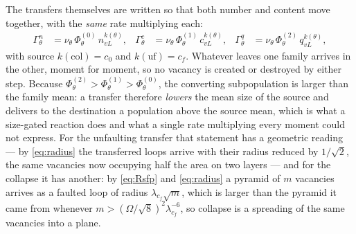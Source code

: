 \documentclass{article}
\begin{document}
The transfers themselves are written so that both number and content move
together, with the \emph{same} rate multiplying each:
\begin{align}
  \Gamma^{n}_{\theta}&=\nu_\theta\,\Phi^{(0)}_\theta\,n^{k(\theta)}_{vL},
  &
  \Gamma^{c}_{\theta}&=\nu_\theta\,\Phi^{(1)}_\theta\,c^{k(\theta)}_{vL},
  &
  \Gamma^{q}_{\theta}&=\nu_\theta\,\Phi^{(2)}_\theta\,q^{k(\theta)}_{vL},
  \label{eq:transfer}
\end{align}
with source $k(\mathrm{col})=c_0$ and $k(\mathrm{uf})=c_f$. Whatever leaves one
family arrives in the other, moment for moment, so no vacancy is created or
destroyed by either step. Because $\Phi^{(2)}_\theta>\Phi^{(1)}_\theta>
\Phi^{(0)}_\theta$, the converting subpopulation is larger than the family mean:
a transfer therefore \emph{lowers} the mean size of the source and delivers to
the destination a population above the source mean, which is what a size-gated
reaction does and what a single rate multiplying every moment could not
express. For the unfaulting transfer that statement has a
geometric reading --- by \cref{eq:radius} the transferred loops arrive with their
radius reduced by $1/\sqrt2$, the same vacancies now occupying half the area on
two layers --- and for the collapse it has another: by \cref{eq:Rsfp} and
\cref{eq:radius} a pyramid of $m$ vacancies arrives as a faulted loop of radius
$\lambda_{c_f}\sqrt m$, which is larger than the pyramid it came from whenever
$m>(\Omega/\sqrt8)^{2}\lambda_{c_f}^{-6}$, so collapse is a spreading of the same
vacancies into a plane.
\end{document}
